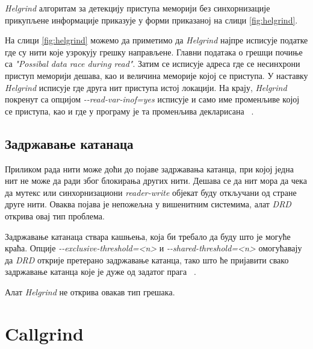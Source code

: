\documentclass[12pt,oneside]{memoir}
\begin{document}
\indent \textit{Helgrind} алгоритам за детекцију приступа меморији без синхорнизације прикупљене информације приказује у форми приказаној на слици \ref{fig:helgrind}. 

\indent На слици \ref{fig:helgrind} можемо да приметимо да \textit{Helgrind} најпре исписује податке где су нити које узрокују грешку направљене. Главни података о грешци почиње са \textit{"Possibal data race during read"}. Затим се исписује адреса где се несинхрони приступ меморији дешава, као и величина меморије којој се приступа. У наставку \textit{Helgrind} исписује где друга нит приступа истој локацији. На крају, \textit{Helgrind} покренут са опцијом \textit{-\--read-var-inof=yes} исписује и само име променљиве којој се приступа, као и где у програму је та променљива декларисана ~\cite{helgrindRef}.

\subsection{Задржавање катанаца}

\indent Приликом рада нити може доћи до појаве задржавања катанца, при којој једна нит не може да ради због блокирања других нити. Дешава се да нит мора да чека да мутекс или синхорнизациони \textit{reader-write} објекат буду откључани од стране друге нити. Оваква појава је непожељна у вишенитним системима, алат \textit{DRD} открива овај тип проблема.

\indent Задржавање катанаца ствара кашњења, која би требало да буду што је могуће краћа. Опције \textit{-\--exclusive-threshold=<n>} и \textit{-\--shared-threshold=<n>} омогућавају да \textit{DRD} открије претерано задржавање катанца, тако што ће пријавити свако задржавање катанца које је дуже од задатог прага ~\cite{drdRef}.

\indent Алат \textit{Helgrind} не открива овакав тип грешака.


\section{Callgrind}
\label{section_callgrind}
\end{document}
